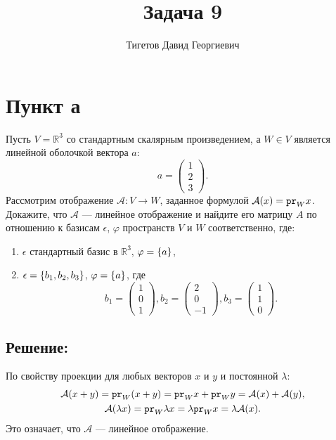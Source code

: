 \documentclass[12pt]{article}
\begin{document}
    \title{Задача 9}
    \author{Тигетов Давид Георгиевич}
    \date{}
    \maketitle

    \section*{Пункт а}
    Пусть $V = \mathbb{R}^3$ со стандартным скалярным произведением, а $W \in V$ является линейной оболочкой вектора $a$:
    \[
        a = \begin{pmatrix}
                1 \\ 2 \\ 3
        \end{pmatrix} .
    \]
    Рассмотрим отображение $\mathcal{A}: V \rightarrow W$, заданное формулой $\mathcal{A}(x) = \texttt{pr}_{W} {x}$. Докажите, что $\mathcal{A}$ --- линейное отображение и найдите его
    матрицу $A$ по отношению к базисам $\epsilon$, $\varphi$ пространств $V$ и $W$ соответственно, где:
    \begin{enumerate}
        \item $\epsilon$ стандартный базис в $\mathbb{R}^3$, $\varphi = \left \{ a \right \}$,
        \item $\epsilon = \left \{ b_1, b_2, b_3 \right \}$, $\varphi = \left \{ a \right \}$, где
        \[
            b_1 = \begin{pmatrix}
                      1 \\ 0 \\ 1
            \end{pmatrix} ,
            b_2 = \begin{pmatrix}
                      2 \\ 0 \\ -1
            \end{pmatrix} ,
            b_3 = \begin{pmatrix}
                      1 \\ 1 \\ 0
            \end{pmatrix} .
        \]
    \end{enumerate}

    \subsection*{Решение:}
    По свойству проекции для любых векторов $x$ и $y$ и постоянной $\lambda$:
    \begin{gather*}
        \mathcal{A}(x + y)
        = \texttt{pr}_{W} {(x + y)}
        = \texttt{pr}_{W} {x} + \texttt{pr}_{W} {y}
        = \mathcal{A}(x) + \mathcal{A}(y), \\
        \mathcal{A}(\lambda x)
        = \texttt{pr}_{W} {\lambda x}
        = \lambda \texttt{pr}_{W} {x}
        = \lambda \mathcal{A}(x) .
    \end{gather*}
    Это означает, что $\mathcal{A}$ --- линейное отображение.
\end{document}
